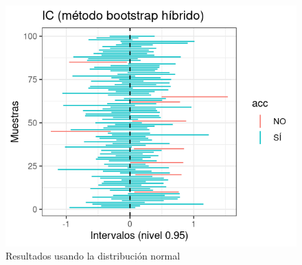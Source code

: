 \documentclass[a4paper]{article}
\begin{document}
\begin{figure}[!htb]
\includegraphics[width=\linewidth]{media/norm-hybrid.png}
\endminipage
\caption{Resultados usando la distribución normal}
   \end{figure}
\end{document}
